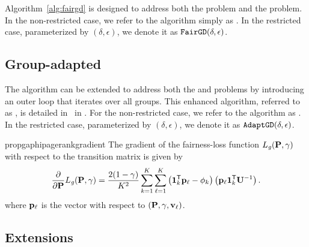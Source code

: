 \documentclass[sigconf, anonymous, review]{acmart}
\begin{document}
Algorithm~\ref{alg:fairgd} is designed to address both the \phiPageRank problem and the \resphiPageRank problem. In the non-restricted case, we refer to the algorithm simply as \fairgd. In the restricted case, parameterized by $(\delta, \epsilon)$, we denote it as ${\texttt{FairGD}}(\delta, \epsilon)$.




\subsection{Group-adapted \pagerank}

The \fairgd algorithm can be extended to address both the \gaphiPageRank and \resgaphiPageRank problems by introducing an outer loop that iterates over all groups. This enhanced algorithm, referred to as \crossgd, 
is detailed in~ in
.
For the non-restricted case, we refer to the algorithm as \crossgd. In the restricted case, parameterized by $(\delta, \epsilon)$, we denote it as ${\texttt{AdaptGD}}(\delta, \epsilon)$.


\begin{restatable}{prop}{gaphipagerankgradient}
\label{theorem:adapted-gradient-fairness-loss}
The gradient of the fairness-loss function 
$L_{\mathit{g}}(\mathbf{{P}}, \gamma)$ 
with respect to the transition matrix \transmatrix is given by
\begin{equation}
\begin{aligned}
\label{eq:gradient_cross_fairness_loss}
    \frac{\partial}{\partial \mathbf{{P}}} L_{\mathit{g}}(\mathbf{{P}}, \gamma) 
         = \frac{2 (1-\gamma)}{K^2} \sum_{k=1}^{K} 
         \sum_{\ell=1}^{K} \left(\mathbf{{1}}_{k}^{\mathsf{T}} \mathbf{{p}}_{\ell} - \phi_k\right) \left( \mathbf{{p}}_{\ell} \mathbf{{1}}_{k}^{\mathsf{T}} \mathbf{{U}}^{-1} \right) .  
\end{aligned}
\end{equation}
where  $\mathbf{{p}}_{\ell}$ is the \pagerank vector with respect to $(\mathbf{{P}}, \gamma, \mathbf{{v}}_{\ell})$.
\end{restatable}


\subsection{Extensions}
\end{document}
